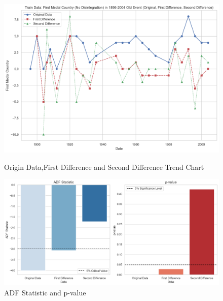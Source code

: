 \documentclass[UTF8]{ctexart}
\begin{document}
\begin{figure}[ht]
  \centering
  \begin{minipage}[b]{0.42\textwidth} %
    \includegraphics[width=\textwidth]{1} %
    \caption{Origin Data,First Difference and Second Difference Trend Chart}
    \label{fig:image-a}
  \end{minipage}
  \hfill %
  \begin{minipage}[b]{0.42\textwidth} %
    \includegraphics[width=\textwidth]{2} %
    \caption{ADF Statistic and p-value}
    \label{fig:image-b}
  \end{minipage}
  \label{fig:images}
\end{figure}
\end{document}
